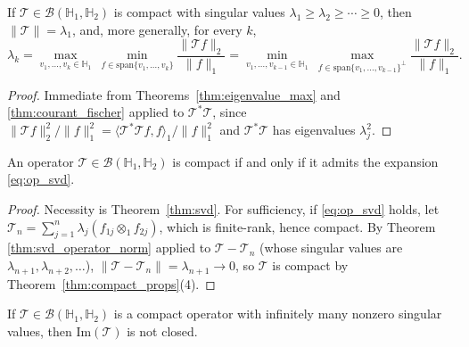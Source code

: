 \begin{theorem}
\label{thm:svd_operator_norm}
If $\mathcal{T}\in\mathcal{B}(\mathbb{H}_1,\mathbb{H}_2)$ is compact with
singular values $\lambda_1\geq\lambda_2\geq\cdots\geq 0$, then
$\|\mathcal{T}\|=\lambda_1$, and, more generally, for every $k$,
\begin{equation}
\lambda_k = \max_{v_1,\dots,v_k\in\mathbb{H}_1}\
\min_{f\in\mathrm{span}\{v_1,\dots,v_k\}}\frac{\|\mathcal{T}f\|_2}{\|f\|_1}
=\min_{v_1,\dots,v_{k-1}\in\mathbb{H}_1}\
\max_{f\in\mathrm{span}\{v_1,\dots,v_{k-1}\}^\perp}\frac{\|\mathcal{T}f\|_2
}{\|f\|_1}.
\label{eq:svd_minimax}
\end{equation}
\end{theorem}

\begin{proof}
Immediate from Theorems~\ref{thm:eigenvalue_max} and
\ref{thm:courant_fischer} applied to $\mathcal{T}^*\mathcal{T}$, since
$\|\mathcal{T}f\|_2^2/\|f\|_1^2 = \langle\mathcal{T}^*\mathcal{T}f,f
\rangle_1/\|f\|_1^2$ and $\mathcal{T}^*\mathcal{T}$ has eigenvalues
$\lambda_j^2$.
\end{proof}

\begin{theorem}
\label{thm:compact_iff_svd}
An operator $\mathcal{T}\in\mathcal{B}(\mathbb{H}_1,\mathbb{H}_2)$ is
compact if and only if it admits the expansion \eqref{eq:op_svd}.
\end{theorem}

\begin{proof}
Necessity is Theorem~\ref{thm:svd}. For sufficiency, if \eqref{eq:op_svd}
holds, let $\mathcal{T}_n=\sum_{j=1}^n\lambda_j(f_{1j}\otimes_1f_{2j})$,
which is finite-rank, hence compact. By Theorem
\ref{thm:svd_operator_norm} applied to $\mathcal{T}-\mathcal{T}_n$ (whose
singular values are $\lambda_{n+1},\lambda_{n+2},\dots$),
$\|\mathcal{T}-\mathcal{T}_n\|=\lambda_{n+1}\to 0$, so $\mathcal{T}$ is
compact by Theorem~\ref{thm:compact_props}(4).
\end{proof}

\begin{theorem}
\label{thm:im_not_closed}
If $\mathcal{T}\in\mathcal{B}(\mathbb{H}_1,\mathbb{H}_2)$ is a compact
operator with infinitely many nonzero singular values, then
$\mathrm{Im}(\mathcal{T})$ is not closed.
\end{theorem}

